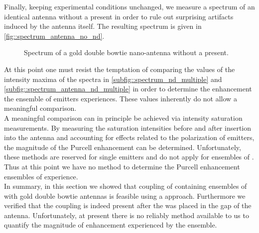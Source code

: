 			Finally, keeping experimental conditions unchanged, we measure a spectrum of an identical antenna without a \nd present in order to rule out surprising artifacts induced by the antenna itself. The resulting spectrum is given in \autoref{fig::spectrum_antenna_no_nd}.

				\begin{figure}[htp]
					\centering
					\caption[Spectrum of a double bowtie antenna without \nd]{Spectrum of a gold double bowtie nano-antenna without a \nd present.}
					\label{fig::spectrum_antenna_no_nd}
				\end{figure}

			At this point one must resist the temptation of comparing the values of the intensity maxima of the spectra in \autoref{subfig::spectrum_nd_multiple} and \autoref{subfig::spectrum_antenna_nd_multiple} in order to determine the enhancement the ensemble of emitters experiences. These values inherently do not allow a meaningful comparison.
			\\
			A meaningful comparison can in principle be achieved via intensity saturation measurements. By measuring the saturation intensities before and after insertion into the antenna and accounting for effects related to the polarization of emitters, the magnitude of the Purcell enhancement can be determined. Unfortunately, these methods are reserved for single emitters and do not apply for ensembles of \sivs. Thus at this point we have no method to determine the Purcell enhancement ensembles of \sivs experience.
			\\
			In summary, in this section we showed that coupling of \nds containing ensembles of \sivs with gold double bowtie antennas is feasible using a \pp approach. Furthermore we verified that the coupling is indeed present after the \nd was placed in the gap of the antenna. Unfortunately, at present there is no reliably method available to us to quantify the magnitude of \fl enhancement experienced by the \siv ensemble.

